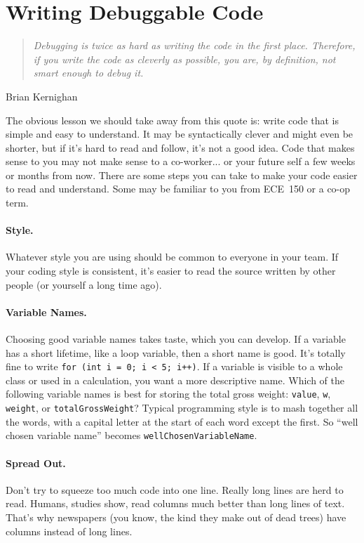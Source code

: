 




\section*{Writing Debuggable Code}
\begin{quote}
	\emph{Debugging is twice as hard as writing the code in the first place. Therefore, if you write the code as cleverly as possible, you are, by definition, not smart enough to debug it.} 
\end{quote}
\hfill Brian Kernighan

The obvious lesson we should take away from this quote is: write code that is simple and easy to understand. It may be syntactically clever and might even be shorter, but if it's hard to read and follow, it's not a good idea. Code that makes sense to you may not make sense to a co-worker... or your future self a few weeks or months from now. There are some steps you can take to make your code easier to read and understand. Some may be familiar to you from ECE~150 or a co-op term.

\paragraph{Style.} 
Whatever style you are using should be common to everyone in your team. If your coding style is consistent, it's easier to read the source written by other people (or yourself a long time ago).

\paragraph{Variable Names.} 
Choosing good variable names takes taste, which you can develop. If a variable has a short lifetime, like a loop variable, then a short name
is good. It's totally fine to write {\tt for (int i = 0; i < 5; i++)}. If a variable is visible to a whole class or used in a calculation, you want a more descriptive name. Which of the following variable names is best for storing the total gross weight: \texttt{value}, \texttt{w}, \texttt{weight}, or \texttt{totalGrossWeight}? Typical programming style is to mash together all the words, with a capital letter at the start of each word except the first. So ``well chosen variable name'' becomes \texttt{wellChosenVariableName}.

\paragraph{Spread Out.}
Don't try to squeeze too much code into one line. Really long lines are herd to read. Humans, studies show, read columns much better than long lines of text. That's why newspapers (you know, the kind they make out of dead trees) have columns instead of long lines.

